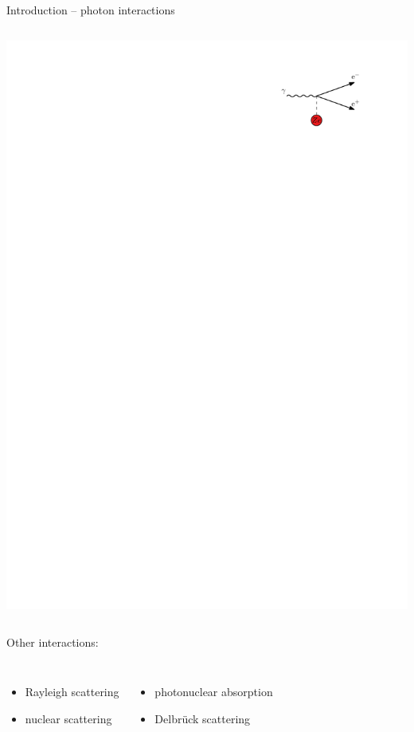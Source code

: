 \documentclass[11pt,xcolor=dvipsnames,professionalfonts]{beamer}
\begin{document}
\begin{frame}{Introduction -- photon interactions}
\begin{columns}
			\includegraphics[width=1.\textwidth]{./figures/pair_intro.pdf}
	\end{columns}
	
	\pause
	
	\vfill
	
	Other interactions:
	\begin{columns}
			\begin{itemize}
				\item Rayleigh scattering
				\item nuclear scattering
			\end{itemize}
		
			\begin{itemize}
				\item photonuclear absorption
				\item Delbrück scattering
			\end{itemize}
	\end{columns}
\end{frame}
\end{document}

